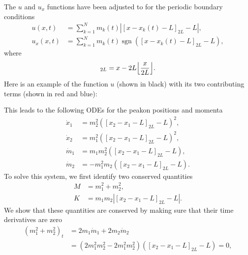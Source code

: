 \documentclass[english,master]{liumaiex}
\theoremstyle{plain}
\theoremstyle{definition}
\DeclareMathOperator{\sgn}{sgn}
\DeclarePairedDelimiter\floor{\lfloor}{\rfloor}
\begin{document}
The $u$ and $u_x$ functions have been adjusted to for the periodic boundary conditions
\begin{equation} \label{eq:periodic_ansatz}
\begin{aligned}
    u(x, t) &= \sum_{k = 1}^{N} m_k(t) |[x - x_k(t) - L]_{2L} - L|, \\
    u_x(x, t) &= \sum_{k = 1}^{N} m_k(t) \sgn([x - x_k(t) - L]_{2L} - L),
\end{aligned}
\end{equation}
where
\begin{equation}
    [x]_{2L} = x - 2L\floor*{\frac{x}{2L}}.
\end{equation}
%
Here is an example of the function $u$ (shown in black) with its two contributing terms (shown in red and blue):
\begin{center}
\end{center}
%
This leads to the following ODEs for the peakon positions and momenta
%
\begin{align}
    \dot{x}_1 & = m_2^2 ([x_2 - x_1 - L]_{2L} - L)^2, \\
    \dot{x}_2 & = m_1^2 ([x_2 - x_1 - L]_{2L} - L)^2, \\
    \dot{m}_1 & = m_1 m_2^2([x_2 - x_1 - L]_{2L} - L),  \\
    \dot{m}_2 & = -m_1^2 m_2([x_2 - x_1 - L]_{2L} - L).
\end{align}
%
To solve this system, we first identify two conserved quantities
\begin{align}
    M &= m_1^2 + m_2^2, \\
    K &= m_1m_2|[x_2 - x_1 - L]_{2L} - L|.
\end{align}
%
We show that these quantities are conserved by making sure that their time derivatives are zero
\begin{equation}
\begin{aligned}
    (m_1^2 + m_2^2)_t 
    &= 2m_1\dot{m}_1 + 2m_2\dot{m}_2 \\
    &= (2m_1^2m_2^2 - 2m_1^2m_2^2)([x_2 - x_1 - L]_{2L} - L) = 0,
\end{aligned}
\end{equation}
\end{document}
